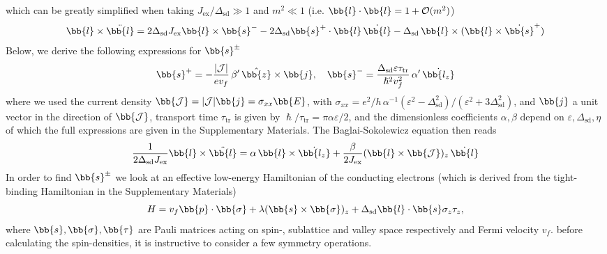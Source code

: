 which can be greatly simplified when taking $J_\text{ex}/\Delta_\text{sd}\gg1$ and $m^2\ll1$ (i.e. $\bb{l}\cdot\bb{l}=1+\mathcal{O}(m^2)$)
\begin{multline}
        \bb{l}\times\ddot{\bb{l}}=2\Delta_\text{sd}J_\text{ex}\bb{l}\times\bb{s}^--2\Delta_\text{sd}\bb{s}^+\cdot\bb{l}\,\dot{\bb{l}}-\Delta_\text{sd}\,\bb{l}\times(\bb{l}\times\dot{\bb{s}}^+)
\end{multline}
Below, we derive the following expressions for $\bb{s}^\pm$
\begin{equation}
    \bb{s}^+ = -\frac{|\mathcal{J}|}{ev_f}\,\beta'\,\hat{\bb{z}}\times\bb{j}, \quad
    \bb{s}^- = \frac{\Delta_\text{sd}\varepsilon\tau_\text{tr}}{\hslash^2v_f^2}\,\alpha' \,\dot{\bb{l_z}}
\end{equation}
where we used the current density $\bb{\mathcal{J}} = |\mathcal{J}|\bb{j}=\sigma_{xx}\bb{E}$, with $\sigma_{xx} = e^2/h\,\alpha^{-1} (\varepsilon^2-\Delta_\text{sd}^2)/(\varepsilon^2+3\Delta_\text{sd}^2)$, and $\bb{j}$ a unit vector in the direction of $\bb{\mathcal{J}}$, transport time $\tau_\text{tr}$ is  given by $\hslash/\tau_\text{tr} =\pi\alpha\varepsilon/2$, and the dimensionless coefficients $\alpha,\beta$ depend on $\varepsilon,\Delta_\text{sd},\eta$ of which the full expressions are given in the Supplementary Materials. The Baglai-Sokolewicz equation then reads
\begin{equation}
       \frac{1}{2\Delta_\text{sd}J_\text{ex}}\bb{l}\times\ddot{\bb{l}}=
            \alpha\,\bb{l}\times\dot{\bb{l_z}}
            +\frac{\beta}{2J_\text{ex}}(\bb{l}\times\bb{\mathcal{J}})_z\,\dot{\bb{l}}
\end{equation}
In order to find $\bb{s}^\pm$ we look at an effective low-energy Hamiltonian of the conducting electrons (which is derived from the tight-binding Hamiltonian in the Supplementary Materials)
\begin{equation}
H = v_f \bb{p}\cdot\bb{\sigma} + \lambda (\bb{s}\times\bb{\sigma})_z+\Delta_\text{sd} \bb{l}\cdot \bb{s}\sigma_z\tau_z,
\end{equation}
where $\bb{s},\bb{\sigma},\bb{\tau}$ are Pauli matrices acting on spin-, sublattice and valley space respectively and Fermi velocity $v_f$.
before calculating the spin-densities, it is instructive to consider a few symmetry operations.

